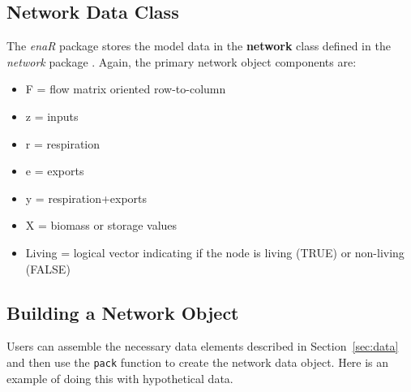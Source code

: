 \documentclass[11pt]{article}
\begin{document}

\subsection{Network Data Class}

The \textit{enaR} package stores the model data in the \textbf{network}
class defined in the \textit{network} package \citep[see][for
details]{butts08_network}. Again, the primary network object
components are: 

\begin{itemize}
\item F = flow matrix oriented row-to-column
\item z = inputs
\item r = respiration
\item e = exports
\item y = respiration+exports
\item X = biomass or storage values
\item Living = logical vector indicating if the node is living
  (TRUE) or non-living (FALSE)
\end{itemize}

\subsection{Building a Network Object}
Users can assemble the necessary data elements described in
Section~\ref{sec:data} and then use the \texttt{pack} function to create the
network data object.  Here is an example of doing this with
hypothetical data.
\end{document}
